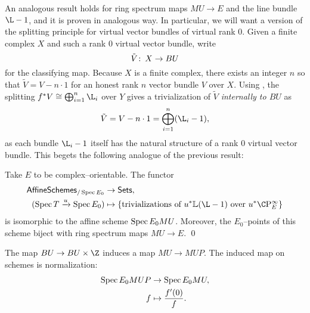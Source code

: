 An analogous result holds for ring spectrum maps $MU \to E$ and the line bundle $\L - 1$, and it is proven in analogous way.  In particular, we will want a version of the splitting principle for virtual vector bundles of virtual rank $0$.  Given a finite complex $X$ and such a rank $0$ virtual vector bundle, write \[\tilde V \colon\thinspace X \to BU\] for the classifying map.  Because $X$ is a finite complex, there exists an integer $n$ so that $\tilde V = V - n \cdot 1$ for an honest rank $n$ vector bundle $V$ over $X$.  Using , the splitting $f^* V \cong \bigoplus_{i=1}^n \L_i$ over $Y$ gives a trivialization of $\tilde V$ \emph{internally to $BU$} as \[\tilde V = V - n \cdot 1 = \bigoplus_{i=1}^n (\L_i - 1),\] as each bundle $\L_i - 1$ itself has the natural structure of a rank $0$ virtual vector bundle.  This begets the following analogue of the previous result:
\begin{theorem}\label{BUTriumvirate}
Take $E$ to be complex--orientable.  The functor
\begin{align*}
\CatOf{AffineSchemes}_{/\Spec E_0} & \to \CatOf{Sets}, \\
(\Spec T \xrightarrow{u} \Spec E_0) & \mapsto \left\{ \text{trivializations of $u^* \ThomSheaf{\L - 1}$ over $u^* \CP^\infty_E$} \right\}
\end{align*}
is isomorphic to the affine scheme $\operatorname{Spec} E_0 MU$.  Moreover, the $E_0$--points of this scheme biject with ring spectrum maps $MU \to E$. \qed
{}
\end{theorem}

\begin{remark}
The map $BU \to BU \times \Z$ induces a map $MU \to MUP$.  The induced map on schemes is normalization:
\begin{align*}
\operatorname{Spec} E_0 MUP & \to \operatorname{Spec} E_0 MU, \\
f & \mapsto \frac{f'(0)}{f}.
\end{align*}
\end{remark}

